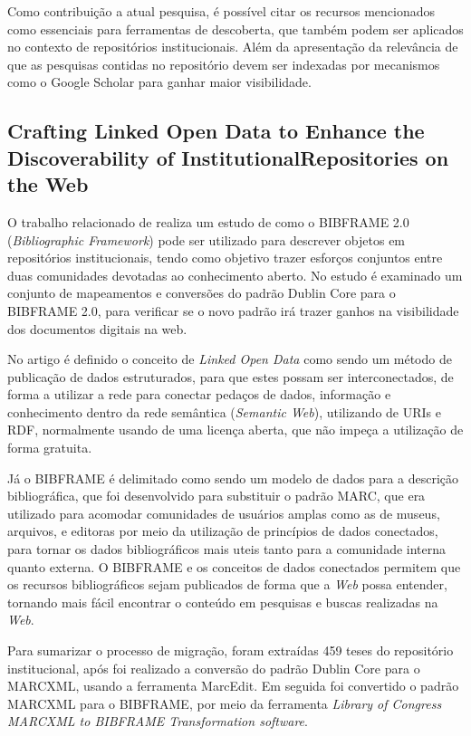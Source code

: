 Como contribuição a atual pesquisa, é possível citar os recursos mencionados
como essenciais para ferramentas de descoberta, que também podem ser aplicados
no contexto de repositórios institucionais. Além da apresentação da relevância
de que as pesquisas contidas no repositório devem ser indexadas por mecanismos
como o Google Scholar para ganhar maior visibilidade.

\subsection{Crafting Linked Open Data to Enhance the Discoverability of InstitutionalRepositories on the Web}

O trabalho relacionado de \cite{Jin:2019} realiza um estudo de como o BIBFRAME 2.0
(\emph{Bibliographic Framework}) pode ser utilizado para descrever objetos em repositórios institucionais, tendo como
objetivo trazer esforços conjuntos entre duas comunidades devotadas ao
conhecimento aberto. No estudo é examinado um conjunto de mapeamentos e conversões
do padrão Dublin Core para o BIBFRAME 2.0, para verificar se o novo padrão irá
trazer ganhos na visibilidade dos documentos digitais na web.

No artigo é definido o conceito de \emph{Linked Open Data} como sendo um
método de publicação de dados estruturados, para que estes possam ser
interconectados, de forma a utilizar a rede para conectar pedaços de dados,
informação e  conhecimento dentro da rede semântica (\emph{Semantic Web}), utilizando de URIs e
RDF, normalmente usando de uma licença aberta, que não impeça a utilização
de forma gratuita.

Já o BIBFRAME é delimitado como sendo um modelo de dados para a descrição
bibliográfica, que foi desenvolvido para substituir o padrão MARC, que
era utilizado para acomodar comunidades de usuários amplas como as de museus,
arquivos, e editoras por meio da utilização de princípios de dados conectados,
para tornar os dados bibliográficos mais uteis tanto para a comunidade interna
quanto externa. O BIBFRAME e os conceitos de dados conectados permitem que
os recursos bibliográficos sejam publicados de forma que a \emph{Web} possa
entender, tornando mais fácil encontrar o conteúdo em pesquisas
e buscas realizadas na \emph{Web}.

Para sumarizar o processo de migração, foram extraídas 459 teses do
repositório institucional, após foi realizado a conversão do padrão
Dublin Core para o MARCXML, usando a ferramenta MarcEdit. Em seguida
foi convertido o padrão MARCXML para o BIBFRAME, por meio da ferramenta
\emph{Library of Congress MARCXML to BIBFRAME Transformation software}.

